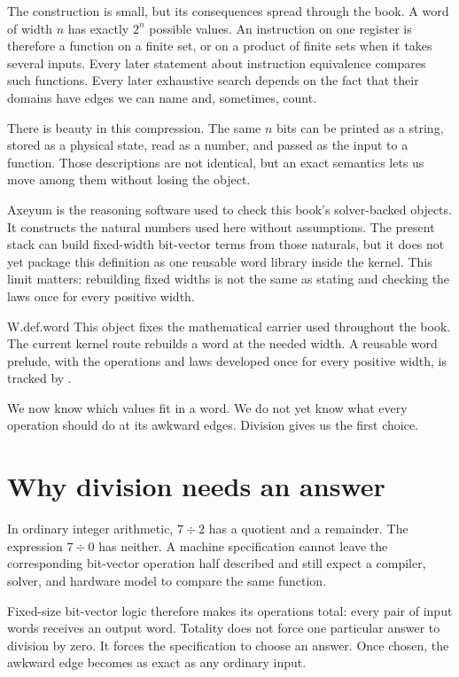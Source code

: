 The construction is small, but its consequences spread through the book. A
word of width \(n\) has exactly \(2^n\) possible values. An instruction on one
register is therefore a function on a finite set, or on a product of finite
sets when it takes several inputs. Every later statement about instruction
equivalence compares such functions. Every later exhaustive search depends
on the fact that their domains have edges we can name and, sometimes, count.

There is beauty in this compression. The same \(n\) bits can be printed as a
string, stored as a physical state, read as a number, and passed as the input
to a function. Those descriptions are not identical, but an exact semantics
lets us move among them without losing the object.

Axeyum is the reasoning software used to check this book's solver-backed
objects. It constructs the natural numbers used here without assumptions. The
present stack can build fixed-width bit-vector terms from those naturals, but
it does not yet package this definition as one reusable word library inside
the kernel. This limit matters: rebuilding fixed widths is not the same as
stating and checking the laws once for every positive width.

\begin{artifact}{W.def.word}
This object fixes the mathematical carrier used throughout the book. The
current kernel route rebuilds a word at the needed width. A reusable word
prelude, with the operations and laws developed once for every positive width,
is tracked by .
\end{artifact}

We now know which values fit in a word. We do not yet know what every
operation should do at its awkward edges. Division gives us the first choice.

\section{Why division needs an answer}
\label{sec:totality}

In ordinary integer arithmetic, \(7\div2\) has a quotient and a remainder.
The expression \(7\div0\) has neither. A machine specification cannot leave
the corresponding bit-vector operation half described and still expect a
compiler, solver, and hardware model to compare the same function.

Fixed-size bit-vector logic therefore makes its operations total: every pair
of input words receives an output word. Totality does not force one particular
answer to division by zero. It forces the specification to choose an answer.
Once chosen, the awkward edge becomes as exact as any ordinary input.

